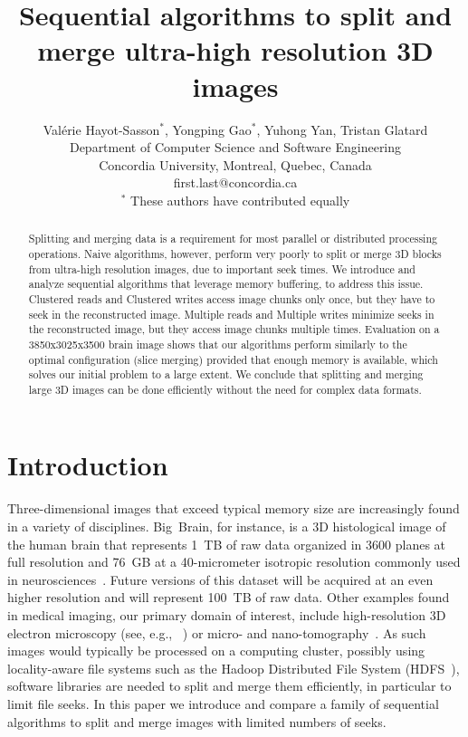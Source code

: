 \documentclass[10pt, conference, compsocconf]{IEEEtran}
\begin{document}
\title{Sequential algorithms to split and merge ultra-high resolution 3D images}

\author{Val\'erie Hayot-Sasson$^*$, Yongping Gao$^*$, Yuhong Yan, Tristan Glatard\\
  Department of Computer Science and Software Engineering\\ Concordia University, Montreal, Quebec, Canada\\
  {first.last}@concordia.ca\\
  $^*$ These authors have contributed equally
  
}

\maketitle

\begin{abstract}
  Splitting and merging data is a requirement for most parallel or
  distributed processing operations. Naive algorithms, however,
  perform very poorly to split or merge 3D blocks from ultra-high
  resolution images, due to important seek times. We introduce and
  analyze sequential algorithms that leverage memory buffering, to
  address this issue. Clustered reads and Clustered writes access image
  chunks only once, but they have to seek in the reconstructed
  image. Multiple reads and Multiple writes minimize seeks in the
  reconstructed image, but they access image chunks multiple
  times. Evaluation on a 3850x3025x3500 brain image shows that our
  algorithms perform similarly to the optimal configuration (slice
  merging) provided that enough memory is available, which solves our
  initial problem to a large extent.  We conclude that splitting and
  merging large 3D images can be done efficiently without the need for
  complex data formats.
\end{abstract}


\section{Introduction}

Three-dimensional images that exceed typical memory size are
increasingly found in a variety of disciplines. Big~Brain, for
instance, is a 3D histological image of the
human brain that represents 1~TB of raw data organized in 3600 planes
at full resolution and 76~GB at a 40-micrometer isotropic resolution
commonly used in neurosciences~\cite{amunts2013bigbrain}. Future
versions of this dataset will be acquired at an even higher resolution
and will represent 100~TB of raw data. Other examples found in medical
imaging, our primary domain of interest, include high-resolution 3D
electron microscopy (see, e.g., ~\cite{bock2011network}) or micro- and
nano-tomography~\cite{10.1371/journal.pone.0035691}. As such images
would typically be processed on a computing cluster, possibly using
locality-aware file systems such as the Hadoop Distributed File System
(HDFS~\cite{shvachko2010hadoop}), software libraries are needed to
split and merge them efficiently, in particular to limit file
seeks. In this paper we introduce and compare a family of sequential
algorithms to split and merge images with limited numbers of seeks.
\end{document}
